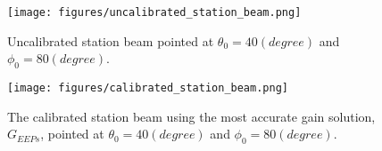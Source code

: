 \documentclass[10pt,a4paper,twocolumn]{article}
\begin{document}
\begin{figure}[H]
    \centering
    \texttt{[image: figures/uncalibrated\_station\_beam.png]}
    \caption{Uncalibrated station beam pointed at $\theta_0 = 40(degree)$ and $\phi_0 = 80(degree)$.}
    \label{fig:uncalibrated_station_beam}
\end{figure}

\begin{figure}[H]
    \centering
    \texttt{[image: figures/calibrated\_station\_beam.png]}
    \caption{The calibrated station beam using the most accurate gain solution, $G_{EEPs}$, pointed at $\theta_0 = 40(degree)$ and $\phi_0 = 80(degree).$}
    \label{fig:calibrated_station_beam}
\end{figure}
\end{document}

